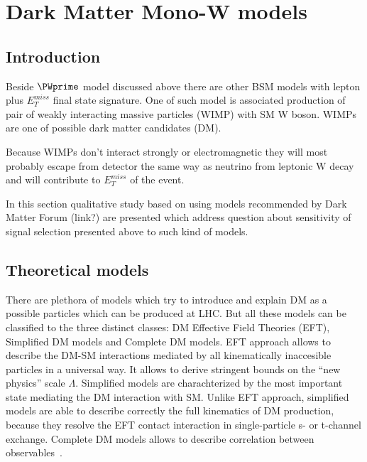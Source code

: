 % 
% 


\chapter{Dark Matter Mono-W models}
\label{chap:monoW}

\section{Introduction}

Beside $\PWprime$ model discussed above there are other BSM models 
with lepton plus $E_{T}^{miss}$ final state signature.
One of such model is associated 
production of pair of weakly interacting massive particles (WIMP)
with SM W boson. WIMPs are one of possible dark matter candidates (DM).

Because WIMPs don't interact strongly or electromagnetic they will most probably escape from detector the same way as neutrino
from leptonic W decay and will contribute to $E_{T}^{miss}$ of the event.

In this section qualitative study based on using models recommended by Dark Matter Forum (link?) are presented 
which address question about sensitivity of signal selection presented above to such kind of models.



\section{Theoretical models}

There are plethora of models which try to introduce and explain DM as a possible particles which can be produced at LHC. 
But all these models can be classified to the three distinct classes: DM Effective Field Theories (EFT), Simplified DM models 
and Complete DM models. EFT approach allows to describe the DM-SM interactions mediated by all 
kinematically inaccesible particles in a universal way. 
It allows to derive stringent bounds on the ``new physics'' scale $\Lambda$. 
Simplified models are charachterized by the most important state mediating the DM interaction with SM. Unlike EFT approach,
simplified models are able to describe correctly the full kinematics of DM production, because they resolve the EFT contact interaction in single-particle 
s- or t-channel exchange. Complete DM models allows to describe correlation between observables~\cite{arXiv:1506.03116}.

